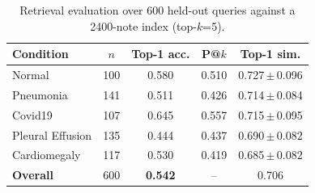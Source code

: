 \begin{table}[t]
\caption{Retrieval evaluation over 600 held-out queries
against a 2400-note index (top-$k$=5).}
\label{tab:rag}
\centering\footnotesize
\setlength\tabcolsep{4pt}
\begin{tabular}{lcccc}
\toprule
Condition & $n$ & Top-1 acc. & P@$k$ & Top-1 sim.\\
\midrule
Normal & 100 & 0.580 & 0.510 & 0.727\,$\pm$\,0.096 \\
Pneumonia & 141 & 0.511 & 0.426 & 0.714\,$\pm$\,0.084 \\
Covid19 & 107 & 0.645 & 0.557 & 0.715\,$\pm$\,0.095 \\
Pleural Effusion & 135 & 0.444 & 0.437 & 0.690\,$\pm$\,0.082 \\
Cardiomegaly & 117 & 0.530 & 0.419 & 0.685\,$\pm$\,0.082 \\
\midrule
\textbf{Overall} & 600 & \textbf{0.542} & -- & 0.706 \\
\bottomrule
\end{tabular}
\end{table}
